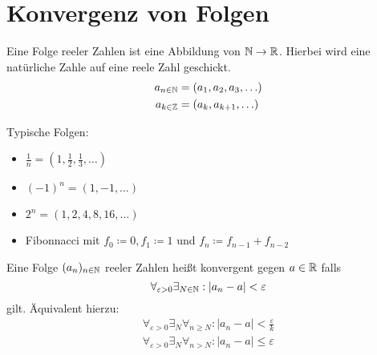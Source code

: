 \section{Konvergenz von Folgen}
Eine Folge reeler Zahlen ist eine Abbildung von $\mathbb{N} \to \mathbb{R}$.
Hierbei wird eine natürliche Zahle auf eine reele Zahl geschickt.
\begin{align*}
	a_{n \in \mathbb{N}} &= (a_1,a_2,a_3,\ldots) \\
	a_{k \in  \mathbb{Z}} &= (a_k, a_{k+1},\ldots)
\end{align*}
\begin{example}
	Typische Folgen:
\begin{itemize}
	\item $\frac{1}{n}= (1,\frac{1}{2},\frac{1}{3},\ldots)$
	\item $(-1)^{n}= (1,-1,\ldots)$
	\item $2^{n}= (1,2,4,8,16,\ldots)$
	\item Fibonnacci mit $f_0 \coloneqq 0, f_1 \coloneqq 1$ und $f_n \coloneqq f_{n-1} + f_{n-2}$  
\end{itemize}
\end{example}
\begin{definition}[Konvergenz]
	Eine Folge $(a_n)_{n \in \mathbb{N}}$ reeler Zahlen heißt konvergent gegen $a \in \mathbb{R}$ falls
	\[
	\forall_{\varepsilon > 0}\exists_{N \in \mathbb{N}}: |a_n -a | < \varepsilon  
	\]
gilt. Äquivalent hierzu:
\begin{align*}
\forall_{\varepsilon > 0} \exists_{N} \forall_{n\ge N}: |a_n -a | < \frac{\varepsilon}{k} \\
\forall_{\varepsilon>0} \exists_{N}\forall_{n>N}: |a_n-a| \le \varepsilon   
\end{align*}
\end{definition}

